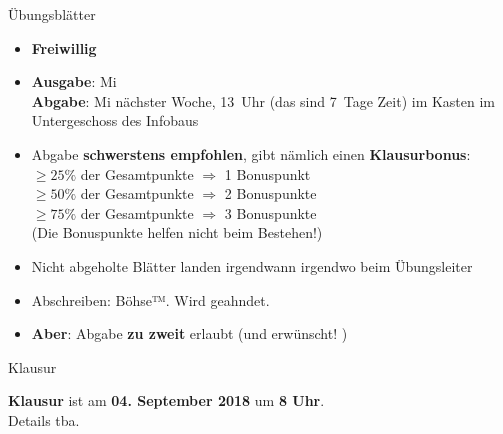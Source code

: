 \begin{frame}{Übungsblätter}  %
	\begin{itemize}
		\item \textbf{Freiwillig}
		\item \textbf{Ausgabe}: Mi \\
			  \textbf{Abgabe}: Mi nächster Woche, 13~Uhr (das sind 7~Tage Zeit) im Kasten im Untergeschoss des Infobaus
		\pause
		\item Abgabe \textbf{schwerstens empfohlen}, gibt nämlich einen \textbf{Klausurbonus}: \\
		$\geq 25 \%$ der Gesamtpunkte $ \Rightarrow $ 1 Bonuspunkt \\
		$\geq 50 \%$  der Gesamtpunkte $ \Rightarrow $ 2 Bonuspunkte \\
		$\geq 75 \%$  der Gesamtpunkte $ \Rightarrow $ 3 Bonuspunkte \\
		(Die Bonuspunkte helfen nicht beim Bestehen!)
		\pause
		\item Nicht abgeholte Blätter landen irgendwann irgendwo beim Übungsleiter 
		\pause
		\item Abschreiben: Böhse™. Wird geahndet.
		\pause
		\item \textbf{Aber}: Abgabe \textbf{zu zweit} erlaubt (und erwünscht! \smiley)
	\end{itemize}
\end{frame} 

\begin{frame}{Klausur}
	\begin{center}
		\textbf{Klausur} ist am \textbf{04. September 2018} um \textbf{8 Uhr}. \\
		\smallskip
		Details tba.
	\end{center}
\end{frame}


